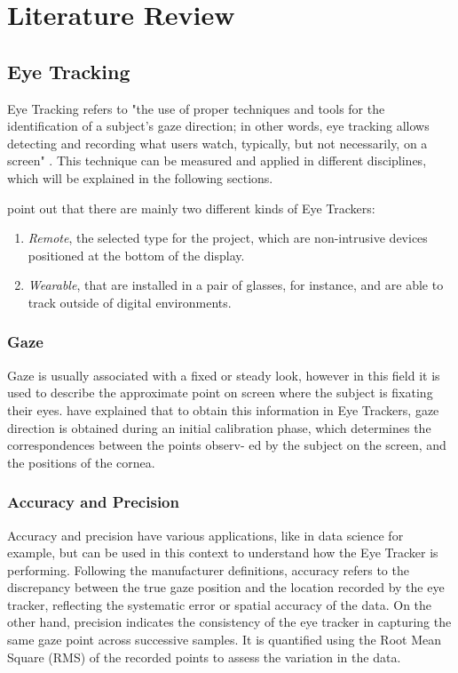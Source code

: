 \section{Literature Review} 

\subsection{Eye Tracking}

Eye Tracking refers to "the use of proper techniques and tools for the identification of a subject's gaze direction; in other words, eye tracking allows detecting and recording what users watch, typically, but not necessarily, on a screen" \citep{inproc:eyetracking-2014}. This technique can be measured and applied in different disciplines, which will be explained in the following sections. 

\citet{art:gaze-hci-2023} point out that there are mainly two different kinds of Eye Trackers:
\begin{enumerate}
    \item \textit{Remote}, the selected type for the project, which are non-intrusive devices positioned at the bottom of the display.
    \item \textit{Wearable}, that are installed in a pair of glasses, for instance, and are able to track outside of digital environments.
\end{enumerate}

\subsubsection{Gaze}

Gaze is usually associated with a fixed or steady look, however in this field it is used to describe the approximate point on screen where the subject is fixating their eyes. \citet{inproc:eyetracking-2014} have explained that to obtain this information in Eye Trackers, gaze direction is obtained during an initial calibration phase, which determines the correspondences between the points observ- ed by the subject on the screen, and the positions of the cornea. 

\subsubsection{Accuracy and Precision}

Accuracy and precision have various applications, like in data science for example, but can be used in this context to understand how the Eye Tracker is performing. Following the manufacturer definitions, accuracy refers to the discrepancy between the true gaze position and the location recorded by the eye tracker, reflecting the systematic error or spatial accuracy of the data. On the other hand, precision indicates the consistency of the eye tracker in capturing the same gaze point across successive samples. It is quantified using the Root Mean Square (RMS) of the recorded points to assess the variation in the data. \citep{misc:acc-prec-tobii-2023}

